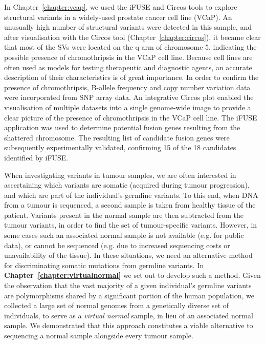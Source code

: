 \begin{justify}
In Chapter~\ref{chapter:vcap}, we used the iFUSE and Circos tools to explore structural variants in a widely-used prostate cancer cell line (VCaP).
An unusually high number of structural variants were detected in this sample, and after visualisation with the Circos tool (Chapter~\ref{chapter:circos}), it became clear that most of the SVs were located on the q arm of chromosome 5, indicating the possible presence of chromothripsis in the VCaP cell line. Because cell lines are often used as models for testing therapeutic and diagnostic agents, an accurate description of their characteristics is of great importance. In order to confirm the presence of chromothripsis, B-allele frequency and copy number variation data were incorporated from SNP array data. An integrative Circos plot enabled the visualisation of multiple datasets into a single genome-wide image to provide a clear picture of the presence of chromothripsis in the VCaP cell line. The iFUSE application was used to determine potential fusion genes resulting from the shattered chromosome. The resulting list of candidate fusion genes were subsequently experimentally validated, confirming 15 of the 18 candidates identified by iFUSE.

When investigating variants in tumour samples, we are often interested in ascertaining which variants are somatic (acquired during tumour progression), and which are part of the individual's germline variants. To this end, when DNA from a tumour is sequenced, a second sample is taken from healthy tissue of the patient. Variants present in the normal sample are then subtracted from the tumour variants, in order to find the set of tumour-specific variants. However, in some cases such an associated normal sample is not available (e.g. for public data), or cannot be sequenced (e.g. due to increased sequencing costs or unavailability of the tissue). In these situations, we need an alternative method for discriminating somatic mutations from germline variants. In \textbf{Chapter~\ref{chapter:virtualnormal}} we set out to develop such a method. Given the observation that the vast majority of a given individual's germline variants are polymorphisms shared by a significant portion of the human population, we collected a large set of normal genomes from a genetically diverse set of individuals, to serve as a \emph{virtual normal} sample, in lieu of an associated normal sample. We demonstrated that this approach constitutes a viable alternative to sequencing a normal sample alongside every tumour sample.



\end{justify}
